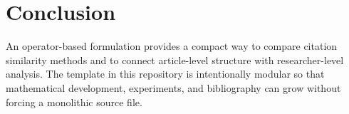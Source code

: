 \section{Conclusion}
\label{sec:conclusion}

An operator-based formulation provides a compact way to compare citation similarity methods
and to connect article-level structure with researcher-level analysis. The template in this
repository is intentionally modular so that mathematical development, experiments, and
bibliography can grow without forcing a monolithic source file.
